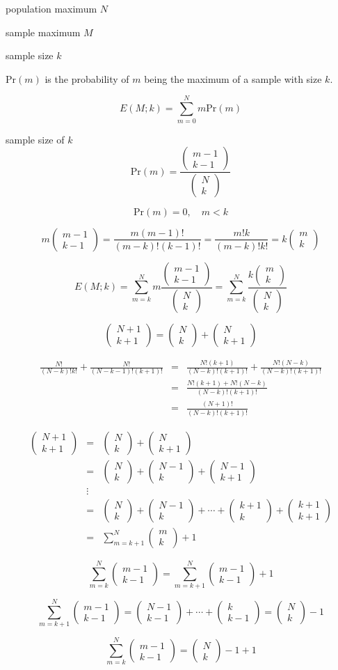 \documentclass[10pt,a4paper]{article}
\begin{document}
\newcommand{\nchoosek}[2]{\left(
\begin{array}{c}
#1 \\ #2
\end{array}
\right)}

population maximum $N$

sample maximum $M$

sample size $k$

$\mathrm{Pr}(m)$ is the probability of $m$ being the maximum of a sample with size $k$.

\[
E(M;k) = \sum_{m = 0}^N m\mathrm{Pr}(m)
\]

sample size of $k$
\[
\mathrm{Pr}(m) =\frac{\nchoosek{m-1}{k-1}}{\nchoosek{N}{k}}
\]

\[
\mathrm{Pr}(m) = 0, \quad m<k
\]

\[
m\nchoosek{m-1}{k-1} = \frac{m(m-1)!}{(m-k)!(k-1)!} = \frac{m!k}{(m-k)!k!} = k\nchoosek{m}{k}
\]

\[
E(M;k) = \sum_{m = k}^N m\frac{\nchoosek{m-1}{k-1}}{\nchoosek{N}{k}} = \sum_{m = k}^N \frac{k\nchoosek{m}{k}}{\nchoosek{N}{k}}
\]


\[
\nchoosek{N+1}{k+1}  =  \nchoosek{N}{k} + \nchoosek{N}{k+1}
\]

\[
\begin{array}{rcl}
\frac{N!}{(N-k)!k!} + \frac{N!}{(N-k-1)!(k+1)!} & = & \frac{N!(k+1)}{(N-k)!(k+1)!}+\frac{N!(N-k)}{(N-k)!(k+1)!} \\
& = & \frac{N!(k+1)+N!(N-k)}{(N-k)!(k+1)!} \\
& = & \frac{(N+1)!}{(N-k)!(k+1)!}
\end{array}
\]

\[
\begin{array}{rcl}
\nchoosek{N+1}{k+1} & = & \nchoosek{N}{k} + \nchoosek{N}{k+1} \\
& = & \nchoosek{N}{k} + \nchoosek{N-1}{k} + \nchoosek{N-1}{k+1} \\
& \vdots & \\
& = & \nchoosek{N}{k} + \nchoosek{N-1}{k} + \cdots + \nchoosek{k+1}{k} +\nchoosek{k+1}{k+1} \\
& = & \sum_{m = k+1}^{N} \nchoosek{m}{k} + 1
\end{array}
\]

\[
\sum_{m = k}^N \nchoosek{m-1}{k-1} = \sum_{m = k+1}^N \nchoosek{m-1}{k-1} + 1
\]

\[
\sum_{m = k+1}^N \nchoosek{m-1}{k-1} = \nchoosek{N-1}{k-1} + \cdots + \nchoosek{k}{k-1} = \nchoosek{N}{k} -1
\]

\[
\sum_{m = k}^N \nchoosek{m-1}{k-1} =  \nchoosek{N}{k} -1 + 1
\]
\end{document}
